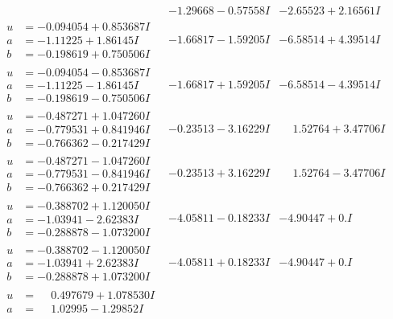 \documentclass[1p]{elsarticle_modified}
\theoremstyle{definition}
\begin{document}
$$\begin{array}{c|c|c}
 & -1.29668 - 0.57558 I & -2.65523 + 2.16561 I \\ \hline\begin{aligned}
u &= -0.094054 + 0.853687 I \\
a &= -1.11225 + 1.86145 I \\
b &= -0.198619 + 0.750506 I\end{aligned}
 & -1.66817 - 1.59205 I & -6.58514 + 4.39514 I \\ \hline\begin{aligned}
u &= -0.094054 - 0.853687 I \\
a &= -1.11225 - 1.86145 I \\
b &= -0.198619 - 0.750506 I\end{aligned}
 & -1.66817 + 1.59205 I & -6.58514 - 4.39514 I \\ \hline\begin{aligned}
u &= -0.487271 + 1.047260 I \\
a &= -0.779531 + 0.841946 I \\
b &= -0.766362 - 0.217429 I\end{aligned}
 & -0.23513 - 3.16229 I & \phantom{-}1.52764 + 3.47706 I \\ \hline\begin{aligned}
u &= -0.487271 - 1.047260 I \\
a &= -0.779531 - 0.841946 I \\
b &= -0.766362 + 0.217429 I\end{aligned}
 & -0.23513 + 3.16229 I & \phantom{-}1.52764 - 3.47706 I \\ \hline\begin{aligned}
u &= -0.388702 + 1.120050 I \\
a &= -1.03941 - 2.62383 I \\
b &= -0.288878 - 1.073200 I\end{aligned}
 & -4.05811 - 0.18233 I & -4.90447 + 0. I\phantom{ +0.000000I} \\ \hline\begin{aligned}
u &= -0.388702 - 1.120050 I \\
a &= -1.03941 + 2.62383 I \\
b &= -0.288878 + 1.073200 I\end{aligned}
 & -4.05811 + 0.18233 I & -4.90447 + 0. I\phantom{ +0.000000I} \\ \hline\begin{aligned}
u &= \phantom{-}0.497679 + 1.078530 I \\
a &= \phantom{-}1.02995 - 1.29852 I \\

\end{aligned}
\end{array}$$
\end{document}
